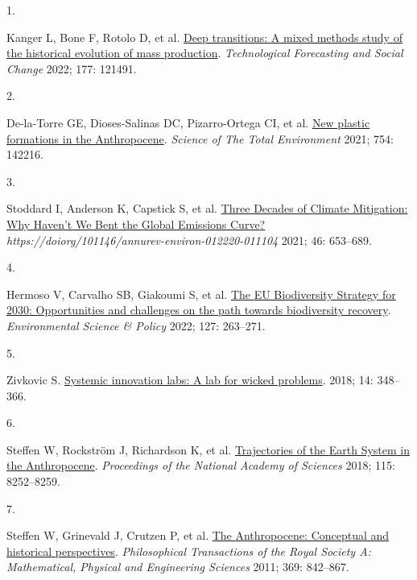 \documentclass[
  11pt,
  a4paperpaper,
  onecolumn]{article}
\newlength{\cslhangindent}
\newlength{\csllabelwidth}
\newlength{\cslentryspacingunit} %
\newenvironment{CSLReferences}[2] %
 {%
  \setlength{\parindent}{0pt}
  \ifodd #1
  \let\oldpar\par
  \def\par{\hangindent=\cslhangindent\oldpar}
  \fi
  \setlength{\parskip}{#2\cslentryspacingunit}
 }%
 {}
\newcommand{\CSLLeftMargin}[1]{\parbox[t]{\csllabelwidth}{#1}}
\newcommand{\CSLRightInline}[1]{\parbox[t]{\linewidth - \csllabelwidth}{#1}\break}
\begin{document}
\hypertarget{refs}{}
\begin{CSLReferences}{0}{0}
\leavevmode{}%
\CSLLeftMargin{1. }%
\CSLRightInline{Kanger L, Bone F, Rotolo D, et al.
\href{https://doi.org/10.1016/j.techfore.2022.121491}{Deep transitions:
{A} mixed methods study of the historical evolution of mass production}.
\emph{Technological Forecasting and Social Change} 2022; 177: 121491.}

\leavevmode{}%
\CSLLeftMargin{2. }%
\CSLRightInline{De-la-Torre GE, Dioses-Salinas DC, Pizarro-Ortega CI, et
al. \href{https://doi.org/10.1016/j.scitotenv.2020.142216}{New plastic
formations in the {Anthropocene}}. \emph{Science of The Total
Environment} 2021; 754: 142216.}

\leavevmode{}%
\CSLLeftMargin{3. }%
\CSLRightInline{Stoddard I, Anderson K, Capstick S, et al.
\href{https://doi.org/10.1146/ANNUREV-ENVIRON-012220-011104}{Three
{Decades} of {Climate Mitigation}: {Why Haven}'t {We Bent} the {Global
Emissions Curve}?}
\emph{https://doiorg/101146/annurev-environ-012220-011104} 2021; 46:
653--689.}

\leavevmode{}%
\CSLLeftMargin{4. }%
\CSLRightInline{Hermoso V, Carvalho SB, Giakoumi S, et al.
\href{https://doi.org/10.1016/J.ENVSCI.2021.10.028}{The {EU Biodiversity
Strategy} for 2030: {Opportunities} and challenges on the path towards
biodiversity recovery}. \emph{Environmental Science \& Policy} 2022;
127: 263--271.}

\leavevmode{}%
\CSLLeftMargin{5. }%
\CSLRightInline{Zivkovic S.
\href{https://doi.org/10.1108/SEJ-04-2018-0036}{Systemic innovation
labs: A lab for wicked problems}. 2018; 14: 348--366.}

\leavevmode{}%
\CSLLeftMargin{6. }%
\CSLRightInline{Steffen W, Rockström J, Richardson K, et al.
\href{https://doi.org/10.1073/pnas.1810141115}{Trajectories of the
{Earth System} in the {Anthropocene}}. \emph{Proceedings of the National
Academy of Sciences} 2018; 115: 8252--8259.}

\leavevmode{}%
\CSLLeftMargin{7. }%
\CSLRightInline{Steffen W, Grinevald J, Crutzen P, et al.
\href{https://doi.org/10.1098/rsta.2010.0327}{The {Anthropocene}:
Conceptual and historical perspectives}. \emph{Philosophical
Transactions of the Royal Society A: Mathematical, Physical and
Engineering Sciences} 2011; 369: 842--867.}


\end{CSLReferences}
\end{document}
